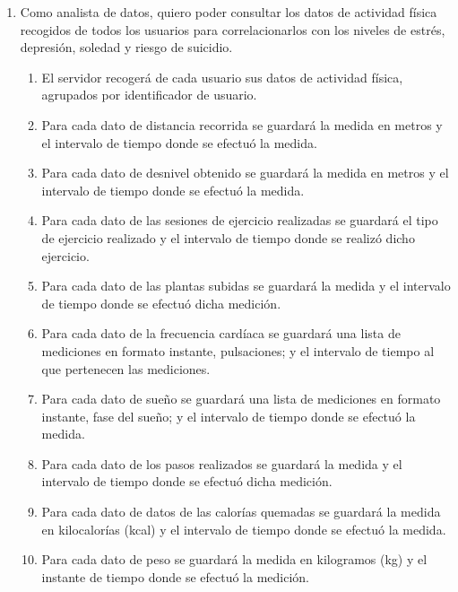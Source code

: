         \begin{enumerate}[resume=req-usuario,label=\textbf{\texttt{RU-\arabic*}}]
            \item \label{req:usuario:analista_actividad_fisica} Como analista de datos, quiero poder consultar los datos de actividad física recogidos de todos los usuarios para correlacionarlos con los niveles de estrés, depresión, soledad y riesgo de suicidio.
            \begin{enumerate}[resume=req-funcionales,label=\textbf{\texttt{RF-\arabic*}}]
                \item \label{req:funcionales:actividad_fisica_recoger} El servidor recogerá de cada usuario sus datos de actividad física, agrupados por identificador de usuario.
                \item \label{req:funcionales:distancia_formato} Para cada dato de distancia recorrida se guardará la medida en metros y el intervalo de tiempo donde se efectuó la medida.
                \item \label{req:funcionales:desnivel_formato} Para cada dato de desnivel obtenido se guardará la medida en metros y el intervalo de tiempo donde se efectuó la medida.
                \item \label{req:funcionales:ejercicio_formato} Para cada dato de las sesiones de ejercicio realizadas se guardará el tipo de ejercicio realizado y el intervalo de tiempo donde se realizó dicho ejercicio.
                \item \label{req:funcionales:plantas_formato} Para cada dato de las plantas subidas se guardará la medida y el intervalo de tiempo donde se efectuó dicha medición.
                \item \label{req:funcionales:frecuencia_formato} Para cada dato de la frecuencia cardíaca se guardará una lista de mediciones en formato instante, pulsaciones; y el intervalo de tiempo al que pertenecen las mediciones.
                \item \label{req:funcionales:sueno_formato} Para cada dato de sueño se guardará una lista de mediciones en formato instante, fase del sueño; y el intervalo de tiempo donde se efectuó la medida.
                \item \label{req:funcionales:pasos_formato} Para cada dato de los pasos realizados se guardará la medida y el intervalo de tiempo donde se efectuó dicha medición.
                \item \label{req:funcionales:calorias_formato} Para cada dato de datos de las calorías quemadas se guardará la medida en kilocalorías (kcal) y el intervalo de tiempo donde se efectuó la medida.
                \item \label{req:funcionales:peso_formato} Para cada dato de peso se guardará la medida en kilogramos (kg) y el instante de tiempo donde se efectuó la medición.
            \end{enumerate}
        \end{enumerate}
        
